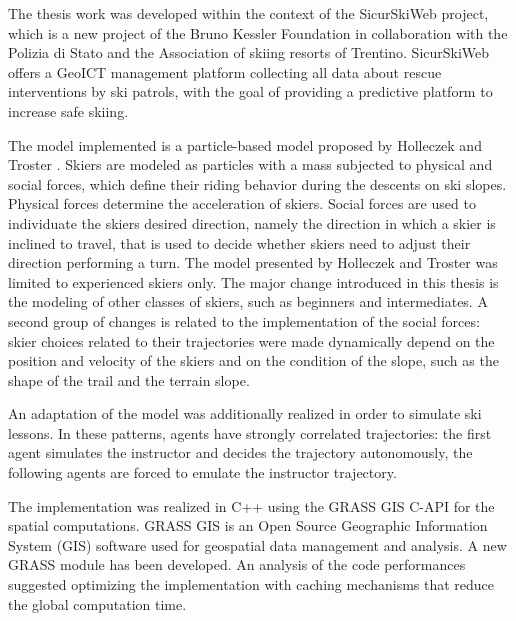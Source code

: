 \documentclass[12pt,a4paper,twoside]{book}
\begin{document}
The thesis work was developed within the context of the SicurSkiWeb project, which is a new project of the Bruno Kessler Foundation in collaboration with the Polizia di Stato and the Association of skiing resorts of Trentino. SicurSkiWeb offers a GeoICT management platform collecting all data about rescue interventions by ski patrols, with the goal of providing a predictive platform to increase safe skiing.

The model implemented is a particle-based model proposed by Holleczek and Troster \cite{hol2012}. Skiers are modeled as particles with a mass subjected to physical and social forces, which define their riding behavior during the descents on ski slopes. Physical forces determine the acceleration of skiers. Social forces are used to individuate the skiers desired direction, namely the direction in which a skier is inclined to travel, that is used to decide whether skiers need to adjust their direction performing a turn. The model presented by Holleczek and Troster was limited to experienced skiers only. The major change introduced in this thesis is the modeling of other classes of skiers, such as beginners and intermediates. A second group of changes is related to the implementation of the social forces: skier choices related to their trajectories were made dynamically depend on the position and velocity of the skiers and on the condition of the slope, such as the shape of the trail and the terrain slope.

An adaptation of the model was additionally realized in order to simulate ski lessons. In these patterns, agents have strongly correlated trajectories: the first agent simulates the instructor and decides the trajectory autonomously, the following agents are forced to emulate the instructor trajectory.

The implementation was realized in C++ using the GRASS GIS C-API for the spatial computations. GRASS GIS is an Open Source Geographic Information System (GIS) software used for geospatial data management and analysis. A new GRASS module has been developed. An analysis of the code performances suggested optimizing the implementation with caching mechanisms that reduce the global computation time.
\end{document}
